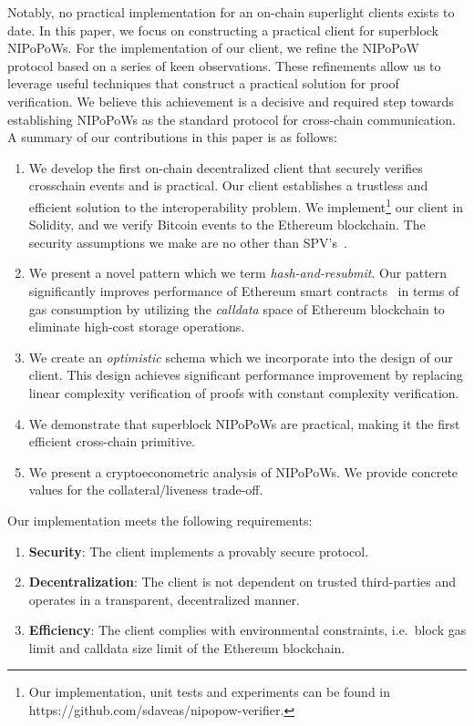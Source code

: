 Notably, no practical implementation for an on-chain superlight
clients exists to date. In this paper, we focus on constructing a practical
client for superblock NIPoPoWs.
For the implementation of our client, we refine the
NIPoPoW protocol based on a series of keen observations. These refinements
allow us to leverage useful techniques that construct a practical solution for
proof verification. We believe this achievement is a decisive and required step towards
establishing NIPoPoWs as the standard protocol for cross-chain communication.
A summary of our contributions in this paper is as follows:
\begin{enumerate}
\item We develop the first on-chain decentralized client that securely verifies
crosschain events and is practical. Our client establishes a trustless and
efficient solution to the interoperability problem. We implement\footnote{Our
implementation, unit tests and experiments can be found in
https://github.com/sdaveas/nipopow-verifier.} our client
in Solidity, and we verify Bitcoin events to the Ethereum blockchain. The
security assumptions we make are no other than
SPV's~\cite{eclipse, eclipse-ethereum}.
\item We present a novel pattern which we term \emph{hash-and-resubmit}. Our
pattern significantly improves performance of Ethereum smart
contracts~\cite{wood, buterin} in terms of gas consumption by utilizing the
\emph{calldata} space of Ethereum blockchain to eliminate high-cost storage
operations.
\item We create an \emph{optimistic} schema which we incorporate into the design
of our client. This design achieves significant performance improvement by
replacing linear complexity verification of proofs with constant complexity
verification.
\item We demonstrate that superblock NIPoPoWs are practical,
making it the first efficient cross-chain primitive.
\item We present a cryptoeconometric analysis of NIPoPoWs.
We provide concrete values for the collateral/liveness trade-off.
\end{enumerate}

Our implementation meets the following requirements:
\begin{enumerate}
\item \textbf{Security}: The client implements a provably secure protocol.
\item \textbf{Decentralization}: The client is not dependent on trusted third-parties
and operates in a transparent, decentralized manner.
\item \textbf{Efficiency}: The client complies with environmental constraints, i.e.\
block gas limit and calldata size limit of the Ethereum blockchain.
\end{enumerate}

